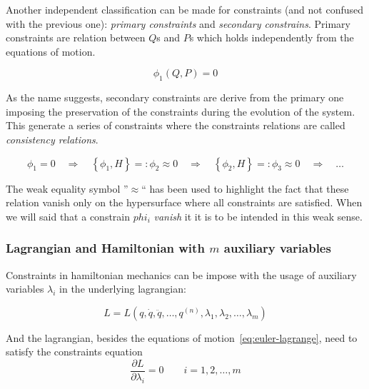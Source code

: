 Another independent classification can be made for constraints (and not confused
with the previous one): \emph{primary constraints} and \emph{secondary
constrains}.  Primary constraints are relation between $Q$s and $P$s which holds
independently from the equations of motion.

\begin{equation} \label{eq:constraint}
  \phi_1(Q, P) = 0
\end{equation}

As the name suggests, secondary constraints are derive from the primary one
imposing the preservation of the constraints during the evolution of the system.
This generate a series of constraints where the constraints relations are called
\emph{consistency relations}.

\begin{equation} \label{eq:consistency_relations}
  \phi_1 = 0 \quad \Rightarrow \quad
  \left\{ \phi_1 , H \right\} =: \phi_2 \approx 0 \quad \Rightarrow \quad
  \left\{ \phi_2 , H \right\} =: \phi_3 \approx 0 \quad \Rightarrow \quad
  \ldots
\end{equation}

The weak equality symbol ''$\approx$`` has been used to highlight the fact that
these relation vanish only on the hypersurface where all constraints are
satisfied. When we will said that a constrain $phi_i$ \emph{vanish} it it is to
be intended in this weak sense.

\subsubsection{Lagrangian and Hamiltonian with $m$ auxiliary variables}
Constraints in hamiltonian mechanics can be impose with the usage of auxiliary
variables $\lambda_i$ in the underlying lagrangian:

\begin{equation*}
  L = L(
  q, \dot{q}, \ddot{q}, \ldots, q^{(n)},
  \lambda_1, \lambda_2, \ldots, \lambda_m
  )
\end{equation*}

And the lagrangian, besides the equations of motion~\eqref{eq:euler-lagrange},
need to satisfy the constraints equation
\begin{equation}
  \frac{\partial L}{\partial \lambda_i} = 0 \qquad i=1, 2, \ldots, m
\end{equation}

